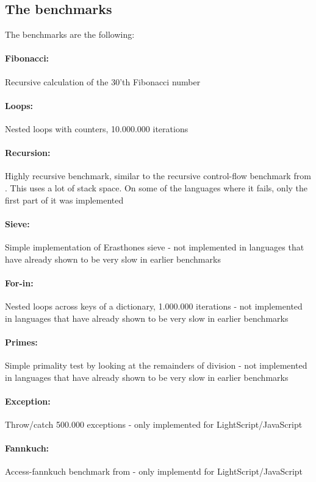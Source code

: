 \documentclass[11pt]{report}
\begin{document}
\subsection{The benchmarks}
The benchmarks are the following:

\paragraph{Fibonacci:} Recursive calculation of the 30'th Fibonacci number
\paragraph{Loops:} Nested loops with counters, 10.000.000 iterations
\paragraph{Recursion:} Highly recursive benchmark, similar to the recursive control-flow benchmark from \cite{sunspider, shootout}. This uses a lot of stack space. On some of the languages where it fails, only the first part of it was implemented %
\paragraph{Sieve:} Simple implementation of Erasthones sieve - not implemented in languages that have already shown to be very slow in earlier benchmarks
\paragraph{For-in:} Nested loops across keys of a dictionary, 1.000.000 iterations - not implemented in languages that have already shown to be very slow in earlier benchmarks
\paragraph{Primes:} Simple primality test by looking at the remainders of division - not implemented in languages that have already shown to be very slow in earlier benchmarks
\paragraph{Exception:} Throw/catch 500.000 exceptions - only implemented for LightScript/JavaScript
\paragraph{Fannkuch:} Access-fannkuch benchmark from \cite{sunspider, shootout} - only implementd for LightScript/JavaScript
\end{document}
